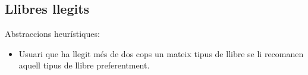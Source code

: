 \subsection{Llibres llegits}
Abstraccions heurístiques:
\begin{itemize}
  \item Usuari que ha llegit més de dos cops un mateix tipus de llibre se li recomanen aquell tipus de llibre preferentment.
\end{itemize}




